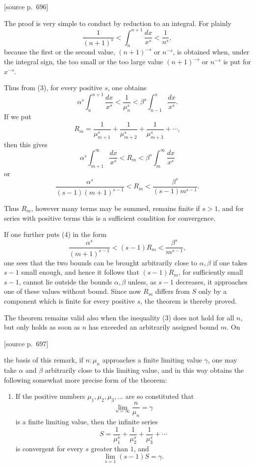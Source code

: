\documentclass[11pt]{article}
\newcommand{\srcpage}[1]{\par\medskip\noindent\textsf{[source p.~#1]}\par\smallskip}
\begin{document}
\srcpage{696}
The proof is very simple to conduct by reduction to an integral. For plainly
\[
\frac1{(n+1)^s}<\int_n^{n+1}\frac{dx}{x^s}<\frac1{n^s},
\]
because the first or the second value, $(n+1)^{-s}$ or $n^{-s}$, is obtained when, under the integral sign, the too small or the too large value $(n+1)^{-s}$ or $n^{-s}$ is put for $x^{-s}$.

Thus from (3), for every positive $s$, one obtains
\[
\alpha^s\int_n^{n+1}\frac{dx}{x^s}<\frac1{\mu_n^s}<\beta^s\int_{n-1}^{n}\frac{dx}{x^s}.
\]
If we put
\[
R_m=\frac1{\mu_{m+1}^s}+\frac1{\mu_{m+2}^s}+\frac1{\mu_{m+3}^s}+\cdots,
\]
then this gives
\[
\alpha^s\int_{m+1}^{\infty}\frac{dx}{x^s}<R_m<\beta^s\int_m^{\infty}\frac{dx}{x^s}
\]
or
\begin{equation}
\frac{\alpha^s}{(s-1)(m+1)^{s-1}}<R_m<\frac{\beta^s}{(s-1)m^{s-1}} .
\tag{4}
\end{equation}

Thus $R_m$, however many terms may be summed, remains finite if $s>1$, and for series with positive terms this is a sufficient condition for convergence.

If one further puts (4) in the form
\[
\frac{\alpha^s}{(m+1)^{s-1}}<(s-1)R_m<\frac{\beta^s}{m^{s-1}},
\]
one sees that the two bounds can be brought arbitrarily close to $\alpha,\beta$ if one takes $s-1$ small enough, and hence it follows that $(s-1)R_m$, for sufficiently small $s-1$, cannot lie outside the bounds $\alpha,\beta$ unless, as $s-1$ decreases, it approaches one of these values without bound. Since now $R_m$ differs from $S$ only by a component which is finite for every positive $s$, the theorem is thereby proved.

The theorem remains valid also when the inequality (3) does not hold for all $n$, but only holds as soon as $n$ has exceeded an arbitrarily assigned bound $m$. On

\srcpage{697}
the basis of this remark, if $n:\mu_n$ approaches a finite limiting value $\gamma$, one may take $\alpha$ and $\beta$ arbitrarily close to this limiting value, and in this way obtains the following somewhat more precise form of the theorem:

\begin{enumerate}[label=\textbf{\arabic*.},leftmargin=2.2em,start=3]
\item If the positive numbers $\mu_1,\mu_2,\mu_3,\ldots$ are so constituted that
\[
\lim_{n=\infty}\frac{n}{\mu_n}=\gamma
\]
is a finite limiting value, then the infinite series
\[
S=\frac1{\mu_1^s}+\frac1{\mu_2^s}+\frac1{\mu_3^s}+\cdots
\]
is convergent for every $s$ greater than $1$, and
\[
\lim_{s=1}(s-1)S=\gamma.
\]
\end{enumerate}
\end{document}
